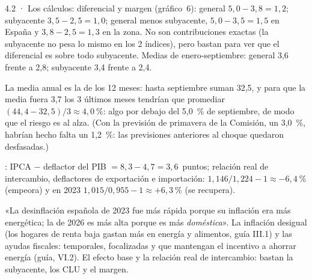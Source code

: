 \begin{complemento}{4.2 · Los cálculos: diferencial y margen}
 (gráfico~6): general $5{,}0-3{,}8=1{,}2$; subyacente $3{,}5-2{,}5=1{,}0$; general menos subyacente, $5{,}0-3{,}5=1{,}5$ en España y $3{,}8-2{,}5=1{,}3$ en la zona. No son contribuciones exactas (la subyacente no pesa lo mismo en los 2 índices), pero bastan para ver que el diferencial es sobre todo subyacente. Medias de enero-septiembre: general 3,6 frente a 2,8; subyacente 3,4 frente a 2,4.

 La media anual es la de los 12 meses: hasta septiembre suman 32,5, y para que la media fuera 3,7 los 3 últimos meses tendrían que promediar $(44{,}4-32{,}5)/3\approx4{,}0~\%$: algo por debajo del 5,0~\% de septiembre, de modo que el riesgo es al alza. (Con la previsión de primavera de la Comisión, un 3,0~\%, habrían hecho falta un 1,2~\%: las previsiones anteriores al choque quedaron desfasadas.)

: IPCA $-$ deflactor del PIB $=8{,}3-4{,}7=3{,}6$~puntos; relación real de intercambio, deflactores de exportación e importación: $1{,}146/1{,}224-1\approx-6{,}4~\%$ (empeora) y en 2023 $1{,}015/0{,}955-1\approx+6{,}3~\%$ (se recupera).

\begin{figuracaja}
\caption{España: CLU nominales, deflactor del PIB y margen, 2019-2025}\label{fig:s04}
\end{figuracaja}


 «La desinflación española de 2023 fue más rápida porque su inflación era más energética; la de 2026 es más alta porque es más \emph{doméstica}».  La inflación desigual (los hogares de renta baja gastan más en energía y alimentos, guía III.1) y las ayudas fiscales: temporales, focalizadas y que mantengan el incentivo a ahorrar energía (guía, VI.2).  El efecto base y la relación real de intercambio: bastan la subyacente, los CLU y el margen.
\end{complemento}
